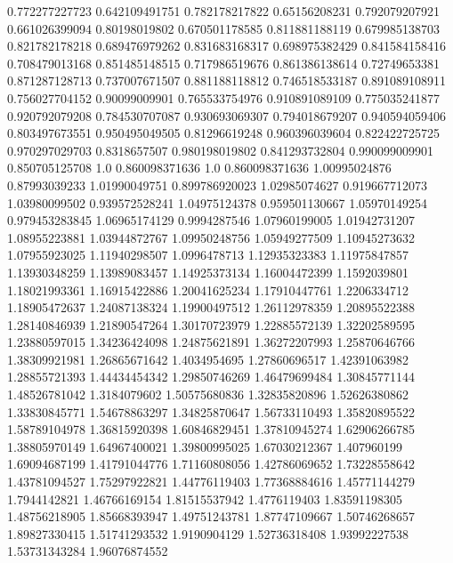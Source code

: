  0.772277227723   0.642109491751
 0.782178217822    0.65156208231
 0.792079207921   0.661026399094
  0.80198019802   0.670501178585
 0.811881188119   0.679985138703
 0.821782178218   0.689476979262
 0.831683168317   0.698975382429
 0.841584158416   0.708479013168
 0.851485148515   0.717986519676
 0.861386138614    0.72749653381
 0.871287128713   0.737007671507
 0.881188118812   0.746518533187
 0.891089108911   0.756027704152
  0.90099009901   0.765533754976
 0.910891089109   0.775035241877
 0.920792079208   0.784530707087
 0.930693069307   0.794018679207
 0.940594059406   0.803497673551
 0.950495049505    0.81296619248
 0.960396039604   0.822422725725
 0.970297029703     0.8318657507
 0.980198019802   0.841293732804
 0.990099009901   0.850705125708
            1.0   0.860098371636
            1.0   0.860098371636
  1.00995024876    0.87993039233
  1.01990049751   0.899786920023
  1.02985074627   0.919667712073
  1.03980099502   0.939572528241
  1.04975124378   0.959501130667
  1.05970149254   0.979453283845
  1.06965174129     0.9994287546
  1.07960199005    1.01942731207
  1.08955223881    1.03944872767
  1.09950248756    1.05949277509
  1.10945273632    1.07955923025
  1.11940298507     1.0996478713
  1.12935323383    1.11975847857
  1.13930348259    1.13989083457
  1.14925373134    1.16004472399
   1.1592039801    1.18021993361
  1.16915422886    1.20041625234
  1.17910447761     1.2206334712
  1.18905472637    1.24087138324
  1.19900497512    1.26112978359
  1.20895522388    1.28140846939
  1.21890547264    1.30170723979
  1.22885572139    1.32202589595
  1.23880597015    1.34236424098
  1.24875621891    1.36272207993
  1.25870646766    1.38309921981
  1.26865671642     1.4034954695
  1.27860696517    1.42391063982
  1.28855721393    1.44434454342
  1.29850746269    1.46479699484
  1.30845771144    1.48526781042
   1.3184079602    1.50575680836
  1.32835820896    1.52626380862
  1.33830845771    1.54678863297
  1.34825870647    1.56733110493
  1.35820895522    1.58789104978
  1.36815920398    1.60846829451
  1.37810945274    1.62906266785
  1.38805970149    1.64967400021
  1.39800995025    1.67030212367
    1.407960199    1.69094687199
  1.41791044776    1.71160808056
  1.42786069652    1.73228558642
  1.43781094527    1.75297922821
  1.44776119403    1.77368884616
  1.45771144279     1.7944142821
  1.46766169154    1.81515537942
   1.4776119403    1.83591198305
  1.48756218905    1.85668393947
  1.49751243781    1.87747109667
  1.50746268657    1.89827330415
  1.51741293532     1.9190904129
  1.52736318408    1.93992227538
  1.53731343284    1.96076874552
